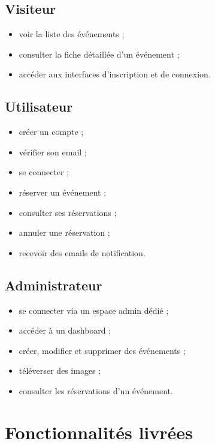 \documentclass[12pt,a4paper]{report}
\begin{document}
\subsection{Visiteur}
\begin{itemize}[leftmargin=1.2cm]
    \item voir la liste des événements ;
    \item consulter la fiche détaillée d'un événement ;
    \item accéder aux interfaces d'inscription et de connexion.
\end{itemize}

\subsection{Utilisateur}
\begin{itemize}[leftmargin=1.2cm]
    \item créer un compte ;
    \item vérifier son email ;
    \item se connecter ;
    \item réserver un événement ;
    \item consulter ses réservations ;
    \item annuler une réservation ;
    \item recevoir des emails de notification.
\end{itemize}

\subsection{Administrateur}
\begin{itemize}[leftmargin=1.2cm]
    \item se connecter via un espace admin dédié ;
    \item accéder à un dashboard ;
    \item créer, modifier et supprimer des événements ;
    \item téléverser des images ;
    \item consulter les réservations d'un événement.
\end{itemize}

\section{Fonctionnalités livrées}
\end{document}
